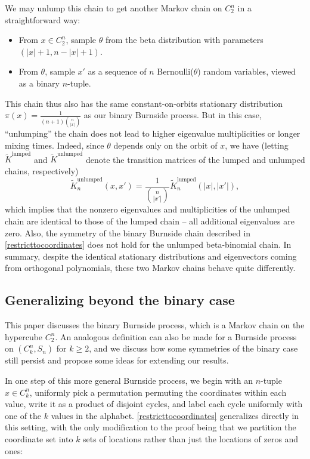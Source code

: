 \documentclass[11pt]{article}
\newcounter{r}
\newcounter{s}
\numberwithin{equation}{section}
\begin{document}
We may unlump this chain to get another Markov chain on $C_2^n$ in a straightforward way:
\begin{itemize}
    \item From $x \in C_2^n$, sample $\theta$ from the beta distribution with parameters $(|x|+1, n-|x|+1)$.
    \item From $\theta$, sample $x'$ as a sequence of $n$ Bernoulli($\theta$) random variables, viewed as a binary $n$-tuple.
\end{itemize}

This chain thus also has the same constant-on-orbits stationary distribution $\pi(x) = \frac{1}{(n+1) \binom{n}{|x|}}$ as our binary Burnside process. But in this case, ``unlumping'' the chain does not lead to higher eigenvalue multiplicities or longer mixing times. Indeed, since $\theta$ depends only on the orbit of $x$, we have (letting $\tilde{K}^{\text{lumped}}$ and $\tilde{K}^{\text{unlumped}}$ denote the transition matrices of the lumped and unlumped chains, respectively)
\[
    \tilde{K}^{\text{unlumped}}_n(x, x') = \frac{1}{\binom{n}{|x'|}}\tilde{K}^{\text{lumped}}_n(|x|, |x'|),
\]
which implies that the nonzero eigenvalues and multiplicities of the unlumped chain are identical to those of the lumped chain -- all additional eigenvalues are zero. Also, the symmetry of the binary Burnside chain described in \cref{restricttocoordinates} does not hold for the unlumped beta-binomial chain. In summary, despite the identical stationary distributions and eigenvectors coming from orthogonal polynomials, these two Markov chains behave quite differently.

\subsection{Generalizing beyond the binary case}\label{beyondbinarysubsection}

This paper discusses the binary Burnside process, which is a Markov chain on the hypercube $C_2^n$. An analogous definition can also be made for a Burnside process on $(C_k^n, S_n)$ for $k \ge 2$, and we discuss how some symmetries of the binary case still persist and propose some ideas for extending our results.

In one step of this more general Burnside process, we begin with an $n$-tuple $x \in C_k^n$, uniformly pick a permutation permuting the coordinates within each value, write it as a product of disjoint cycles, and label each cycle uniformly with one of the $k$ values in the alphabet. \cref{restricttocoordinates} generalizes directly in this setting, with the only modification to the proof being that we partition the coordinate set into $k$ sets of locations rather than just the locations of zeros and ones:
\end{document}
